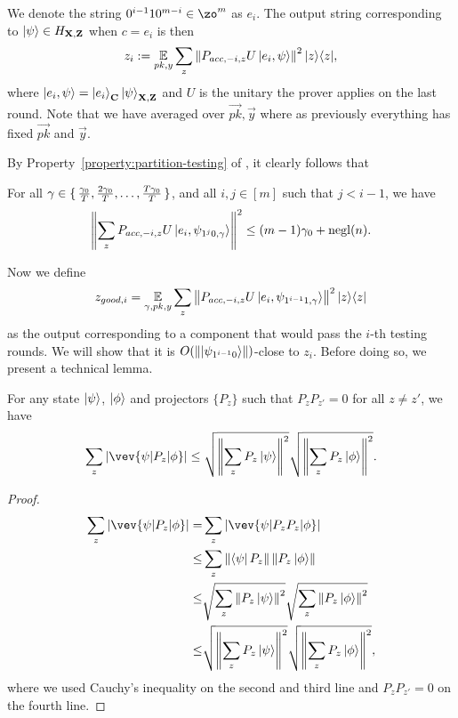 We denote the string $0^{i-1}10^{m-i} \in \zo^m$ as $e_i$. The output string corresponding to $\ket{\psi} \in H_{\mathbf{X},\mathbf{Z}}$ when $c=e_i$ is then
\begin{equation}
	\label{eq:zi-def}
	z_i:= \operatorname*{\mathbb{E}}_{pk,y} \sum_z \left\lVert P_{acc,-i,z} U\ket{e_i,\psi}\right\rVert^2|z\rangle\langle z|,
\end{equation}
 where $\ket{e_i,\psi}=\ket{e_i}_{\mathbf{C}}\ket{\psi}_{\mathbf{X},\mathbf{Z}}$ and $U$ is the unitary the prover applies on the last round.
Note that we have averaged over $\vec{pk}, \vec{y}$ where as previously everything has fixed $\vec{pk}$ and $\vec{y}$.

By Property~\ref{property:partition-testing} of ,
it clearly follows that 
\begin{cor}
	\label{lem:partition-testing}
	For all $\gamma\in\set{\frac{\gamma_0}{T},\frac{2\gamma_0}{T},\dots,\frac{T\gamma_0}{T}}$, and all $i,j\in[m]$ such that $j<i-1$, we have
	$$\left\lVert\sum_z P_{acc,-i,z} U \ket{e_i, \psi_{1^j0,\gamma}}\right\rVert^2\leq (m-1)\gamma_0+\operatorname{negl}(n).$$
\end{cor}

Now we define
\begin{equation}
	\label{eq:zgoodi-def}
	z_{good, i}=\operatorname*{\mathbb{E}}_{\gamma, pk, y} \sum_z \left\lVert P_{acc,-i,z} U\ket{e_i,\psi_{1^{i-1}1,\gamma}}\right\rVert^2|z\rangle\langle z|
\end{equation}
as the output corresponding to a component that would pass the $i$-th testing rounds.
We will show that it is $O(\left\lVert\ket{\psi_{1^{i-1}0}}\right\rVert)$-close to $z_i$.
Before doing so, we present a technical lemma.

\begin{lemma}\label{lem:samp-tech-2}
	For any state $\ket{\psi}$,  $\ket{\phi}$ and projectors $\{P_z\}$ such that $P_z P_{z'} =0 $ for all $z\neq z'$, we have
	$$  \sum_z |\vev{\psi|P_z|\phi}| \leq \sqrt{\norm{\sum_z P_z\ket{\psi}}^2 } \sqrt{\norm{\sum_z P_z\ket{\phi}}^2 }. $$
\end{lemma}
\begin{proof}
	\begin{align}
		\sum_z |\vev{\psi|P_z|\phi}| =&\sum_z|\vev{\psi|P_zP_z|\phi}| \nn \\
		\leq& \sum_z \norm{\bra{\psi}P_z} \norm{ P_z\ket{\phi}} \nn \\
		\leq&  \sqrt{\sum_z \norm{P_z\ket{\psi}}^2} \sqrt{\sum_z\norm{P_z\ket{\phi}}^2} \nn \\
		\leq& \sqrt{\norm{\sum_z P_z\ket{\psi}}^2 } \sqrt{\norm{\sum_z P_z\ket{\phi}}^2 } \nn,
	\end{align}
	where we used Cauchy's inequality on the second and third line and $P_z P_{z'} =0 $ on the fourth line.
\end{proof}

